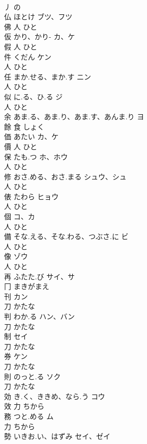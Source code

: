 \documentclass[8pt]{extreport}
\begin{document}
\begin{CJK}{UTF8}{min}
\\	丿		の		
\\	仏	ほとけ	ブツ、フツ	
\\	佛	人		ひと		
\\	仮	かり、かり-	カ、ケ	
\\	假	人		ひと		
\\	件	くだん	ケン	
\\	人		ひと		
\\	任	まか.せる、まか.す	ニン	
\\	人		ひと		
\\	似	に.る、ひ.る	ジ	
\\	人		ひと		
\\	余	あま.る、あま.り、あま.す、あんま.り	ヨ	
\\	餘	食		しょく		
\\	価	あたい	カ、ケ	
\\	價	人		ひと		
\\	保	たも.つ	ホ、ホウ	
\\	人		ひと		
\\	修	おさ.める、おさ.まる	シュウ、シュ	
\\	人		ひと		
\\	俵	たわら	ヒョウ	
\\	人		ひと		
\\	個		コ、カ	
\\	人		ひと		
\\	備	そな.える、そな.わる、つぶさ.に	ビ	
\\	人		ひと		
\\	像		ゾウ	
\\	人		ひと		
\\	再	ふたた.び	サイ、サ	
\\	冂		まきがまえ		
\\	刊		カン	
\\	刀		かたな		
\\	判	わか.る	ハン、バン	
\\	刀		かたな		
\\	制		セイ	
\\	刀		かたな		
\\	券		ケン	
\\	刀		かたな		
\\	則	のっと.る	ソク	
\\	刀		かたな		
\\	効	き.く、ききめ、なら.う	コウ	
\\	效	力		ちから		
\\	務	つと.める	ム	
\\	力		ちから		
\\	勢	いきお.い、はずみ	セイ、ゼイ	

\end{CJK}
\end{document}

